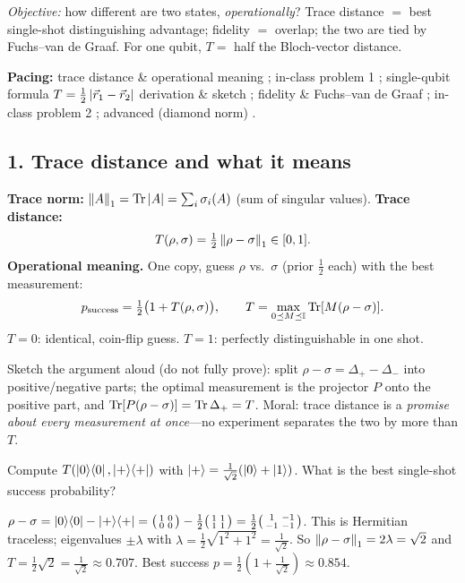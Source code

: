 \documentclass[11pt]{article}
\begin{document}
\noindent\emph{Objective:} how different are two states, \emph{operationally}? Trace
distance $=$ best single-shot distinguishing advantage; fidelity $=$ overlap; the two
are tied by Fuchs--van de Graaf. For one qubit, $T=$ half the Bloch-vector distance.

\medskip
\noindent\textbf{Pacing:} trace distance \& operational meaning ; in-class
problem 1 ; single-qubit formula $T=\tfrac12\left\lvert \vec r_1-\vec r_2 \right\rvert$
derivation \& sketch ; fidelity \& Fuchs--van de Graaf ;
in-class problem 2 ; advanced (diamond norm) .

\subsection*{1. Trace distance and what it means }
\begin{board}
\textbf{Trace norm:} $\left\lVert A \right\rVert_1=\operatorname{Tr}\left\lvert A \right\rvert=\sum_i\sigma_i(A)$ (sum of singular values).
\textbf{Trace distance:}
\[
  T(\rho,\sigma)=\tfrac12\left\lVert \rho-\sigma \right\rVert_1\in[0,1].
\]
\textbf{Operational meaning.} One copy, guess $\rho$ vs.\ $\sigma$ (prior $\tfrac12$
each) with the best measurement:
\[
  p_{\mathrm{success}}=\tfrac12\big(1+T(\rho,\sigma)\big),\qquad
  T=\max_{0\preceq M\preceq\mathbb{I}}\operatorname{Tr}[M(\rho-\sigma)].
\]
$T=0$: identical, coin-flip guess. $T=1$: perfectly distinguishable in one shot.
\end{board}

Sketch the argument aloud (do not fully prove): split $\rho-\sigma=\Delta_+-\Delta_-$
into positive/negative parts; the optimal measurement is the projector $P$ onto the
positive part, and $\operatorname{Tr}[P(\rho-\sigma)]=\operatorname{Tr}\Delta_+=T$. Moral: trace distance is a
\emph{promise about every measurement at once}---no experiment separates the two by
more than $T$.

\begin{inclass}\label{ic:tdist}
Compute $T(\ket{0}\!\bra{0},\ket{+}\!\bra{+})$ with $\ket+=\tfrac1{\sqrt2}(\ket0+\ket1)$. What is the best
single-shot success probability?
\end{inclass}
\begin{answer}
$\rho-\sigma=\ket{0}\!\bra{0}-\ket{+}\!\bra{+}=\big(\begin{smallmatrix}1&0\\0&0\end{smallmatrix}\big)
-\tfrac12\big(\begin{smallmatrix}1&1\\1&1\end{smallmatrix}\big)
=\tfrac12\big(\begin{smallmatrix}1&-1\\-1&-1\end{smallmatrix}\big)$. This is
Hermitian traceless; eigenvalues $\pm\lambda$ with
$\lambda=\tfrac12\sqrt{1^2+1^2}=\tfrac1{\sqrt2}$. So $\left\lVert \rho-\sigma \right\rVert_1=2\lambda=\sqrt2$
and $T=\tfrac12\sqrt2=\tfrac1{\sqrt2}\approx0.707$. Best success
$p=\tfrac12(1+\tfrac1{\sqrt2})\approx0.854$.
\end{answer}
\end{document}
